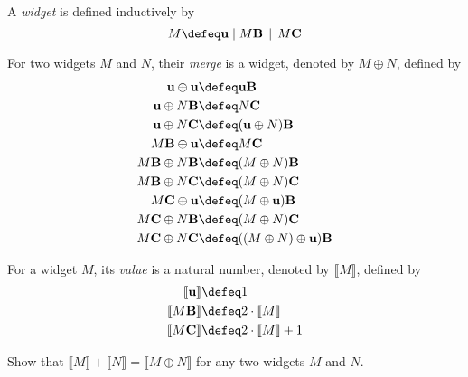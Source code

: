 {\begin{exercises}
\begin{multicols}{2}
\begin{enumerate}
    \end{enumerate}
  \end{multicols}
\end{exercises}


\begin{exercise}
\newcommand{\unit}{\mathord{\textbf{u}}}
\newcommand{\B}{\mathord{\textbf{B}}}
\newcommand{\C}{\mathord{\textbf{C}}}
\newcommand{\denotation}{\mathord{\textsf{val}}}

A \emph{widget} is defined inductively by
\[M \defeq \unit \mid M\B \,\mid\, M\C\]

For two widgets $M$ and $N$, their
\emph{merge} is a widget, denoted by $M\oplus N$, defined by
\begin{align*}
\unit \oplus \unit &\defeq \unit\B\\
\unit \oplus N\B &\defeq N\C\\
\unit \oplus N\C &\defeq (\unit \oplus N)\B\\ 
M\B \oplus \unit &\defeq M\C\\
M\B \oplus N\B &\defeq (M\oplus N)\B\\
M\B \oplus N\C &\defeq (M\oplus N)\C\\
M\C \oplus \unit &\defeq  (M\oplus \unit)\B\\
M\C \oplus N\B&\defeq (M\oplus N)\C\\
M\C \oplus N\C&\defeq ((M\oplus N) \oplus \unit)\B
\end{align*} 

For a widget $M$, its \emph{value} is a natural number, denoted by
$\llbracket M\rrbracket$, defined by
\begin{align*}
  \llbracket\unit\rrbracket &\defeq 1\\
  \llbracket M\B\rrbracket &\defeq 2\cdot \llbracket M\rrbracket\\
  \llbracket M\C\rrbracket &\defeq 2\cdot \llbracket M\rrbracket + 1
\end{align*}

Show that $\llbracket M\rrbracket + \llbracket N\rrbracket = \llbracket M\oplus N\rrbracket$ for any two
widgets $M$ and $N$.
\end{exercise}
}
